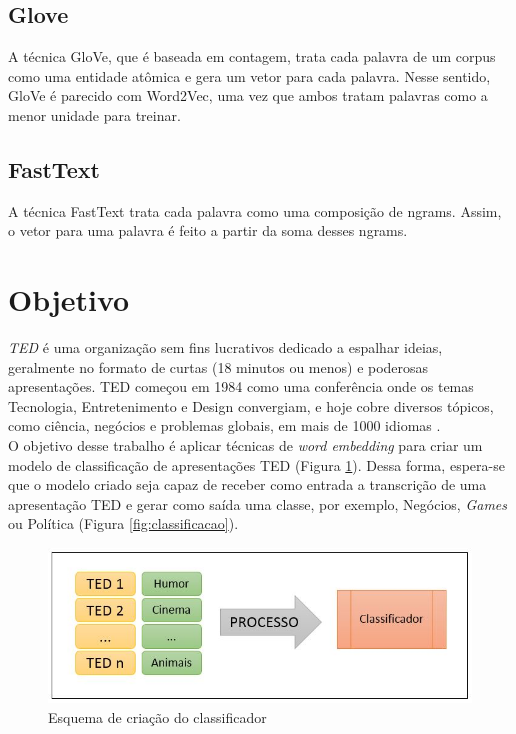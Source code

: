 \documentclass{article}
\begin{document}
\subsection{Glove}

A técnica GloVe, que é baseada em contagem, trata cada palavra de um corpus como uma entidade atômica e gera um vetor para cada palavra. Nesse sentido, GloVe é parecido com Word2Vec, uma vez que ambos tratam palavras como a menor unidade para treinar.

\subsection{FastText}

A técnica FastText trata cada palavra como uma composição de ngrams. Assim, o vetor para uma palavra é feito a partir da soma desses ngrams.


\section{Objetivo}

\textit{TED} é uma organização sem fins lucrativos dedicado a espalhar ideias, geralmente no formato de curtas (18 minutos ou menos) e poderosas apresentações. TED começou em 1984 como uma conferência onde os temas Tecnologia, Entretenimento e Design convergiam, e hoje cobre diversos tópicos, como ciência, negócios e problemas globais, em mais de 1000 idiomas \citep{ted}.\\

O objetivo desse trabalho é aplicar técnicas de \textit{word embedding} para criar um modelo de classificação de apresentações TED (Figura \ref{fig:modelo}). Dessa forma, espera-se que o modelo criado seja capaz de receber como entrada a transcrição de uma apresentação TED e gerar como saída uma classe, por exemplo, Negócios, \textit{Games} ou Política (Figura \ref{fig:classificacao}).\\

\begin{figure}[h!]
\centering
\includegraphics[scale=0.5]{modelo.JPG}
\caption{Esquema de criação do classificador}
\label{fig:modelo}
\end{figure}
\end{document}
